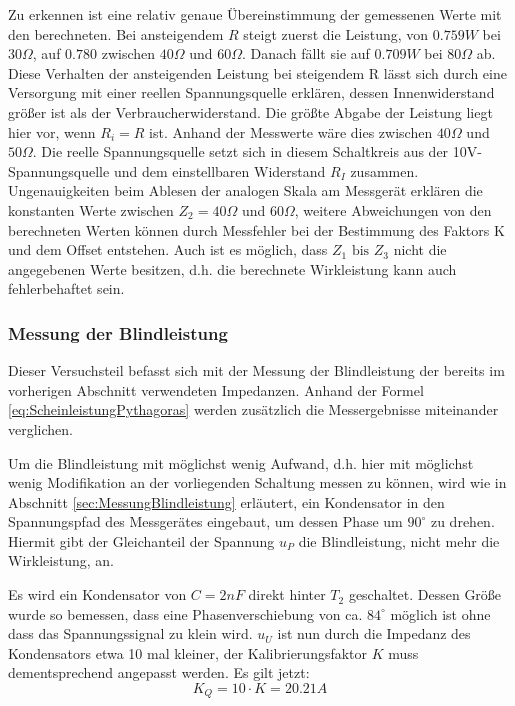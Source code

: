 Zu erkennen ist eine relativ genaue Übereinstimmung der gemessenen Werte mit den berechneten. Bei ansteigendem $R$ steigt zuerst die Leistung, von $0.759W$ bei $30\Omega$, auf $0.780$ zwischen $40\Omega$ und $60\Omega$. Danach fällt sie auf $0.709W$ bei $80\Omega$ ab. Diese Verhalten der ansteigenden Leistung bei steigendem R lässt sich durch eine Versorgung mit einer reellen Spannungsquelle erklären, dessen Innenwiderstand größer ist als der Verbraucherwiderstand. Die größte Abgabe der Leistung liegt hier vor, wenn $R_i = R$ ist. Anhand der Messwerte wäre dies zwischen $40\Omega$ und $50\Omega$. Die reelle Spannungsquelle setzt sich in diesem Schaltkreis aus der 10V-Spannungsquelle und dem einstellbaren Widerstand $R_I$ zusammen.
Ungenauigkeiten beim Ablesen der analogen Skala am Messgerät erklären die konstanten Werte zwischen $Z_2 = 40\Omega$ und $60\Omega$, weitere Abweichungen von den berechneten Werten können durch Messfehler bei der Bestimmung des Faktors K und dem Offset entstehen. Auch ist es möglich, dass $Z_1 \mbox{ bis } Z_3$ nicht die angegebenen Werte besitzen, d.h. die berechnete Wirkleistung kann auch fehlerbehaftet sein.

\subsubsection{Messung der Blindleistung}
Dieser Versuchsteil befasst sich mit der Messung der Blindleistung der bereits im vorherigen Abschnitt verwendeten Impedanzen. Anhand der Formel \eqref{eq:ScheinleistungPythagoras} werden zusätzlich die Messergebnisse miteinander verglichen.

Um die Blindleistung mit möglichst wenig Aufwand, d.h. hier mit möglichst wenig Modifikation an der vorliegenden Schaltung messen zu können, wird wie in Abschnitt \ref{sec:MessungBlindleistung} erläutert, ein Kondensator in den Spannungspfad des Messgerätes eingebaut, um dessen Phase um $90^\circ$ zu drehen. Hiermit gibt der Gleichanteil der Spannung $u_P$ die Blindleistung, nicht mehr die Wirkleistung, an.

Es wird ein Kondensator von $C=2nF$ direkt hinter $T_2$ geschaltet. Dessen Größe wurde so bemessen, dass eine Phasenverschiebung von ca. $84^\circ$ möglich ist ohne dass das Spannungssignal zu klein wird. $u_U$ ist nun durch die Impedanz des Kondensators etwa 10 mal kleiner, der Kalibrierungsfaktor $K$ muss dementsprechend angepasst werden. Es gilt jetzt:
\begin{equation}
K_{Q} = 10\cdot K = 20.21A
\end{equation}

